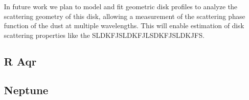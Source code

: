 In future work we plan to model and fit geometric disk profiles to analyze the scattering geometry of this disk, allowing a measurement of the scattering phase function of the dust at multiple wavelengths. This will enable estimation of disk scattering properties like the SLDKFJSLDKFJLSDKFJSLDKJFS.

\subsection{R Aqr\label{sec:raqr}}

\subsection{Neptune\label{sec:neptune}}
